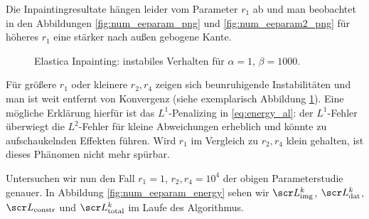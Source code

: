\documentclass{mythesis}
\begin{document}
Die Inpaintingresultate hängen leider vom Parameter $r_1$ ab und man beobachtet in den Abbildungen \ref{fig:num_eeparam_png} und \ref{fig:num_eeparam2_png} für höheres $r_1$ eine stärker nach außen gebogene Kante.

\begin{figure}[ht]
    \centering
    \caption{Elastica Inpainting: instabiles Verhalten für $\alpha = 1$, $\beta = 1000$.}
    \label{fig:num_eeparam_instab}
\end{figure}

Für größere $r_1$ oder kleinere $r_2, r_4$ zeigen sich beunruhigende Instabilitäten und man ist weit entfernt von Konvergenz (siehe exemplarisch Abbildung \ref{fig:num_eeparam_instab}).
Eine mögliche Erklärung hierfür ist das $L^1$-Penalizing in \eqref{eq:energy_al}: der $L^1$-Fehler überwiegt die $L^2$-Fehler für kleine Abweichungen erheblich und könnte zu aufschaukelnden Effekten führen.
Wird $r_1$ im Vergleich zu $r_2, r_4$ klein gehalten, ist dieses Phänomen nicht mehr spürbar.

Untersuchen wir nun den Fall $r_1 = 1$, $r_2, r_4 = 10^4$ der obigen Parameterstudie genauer.
In Abbildung \ref{fig:num_eeparam_energy} sehen wir $\scr L_{\mathrm{img}}^k$, $\scr L_{\mathrm{dat}}^k$, $\scr L_{\mathrm{constr}}$ und $\scr L_{\mathrm{total}}^k$ im Laufe des Algorithmus.
\end{document}
